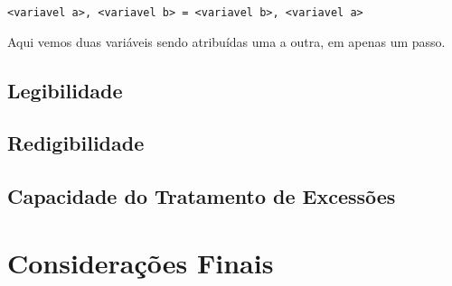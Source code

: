 \documentclass[12pt]{article}
\begin{document}
\begin{lstlisting}
<variavel a>, <variavel b> = <variavel b>, <variavel a>
\end{lstlisting}

Aqui vemos duas variáveis sendo atribuídas uma a outra, em apenas um passo.

\subsection{Legibilidade}\label{sec:legibilidade}

\subsection{Redigibilidade}\label{sec:redigibilidade}

\subsection{Capacidade do Tratamento de Excessões}\label{sec:excessoes}


\section{Considerações Finais}


\printbibliography
\end{document}
